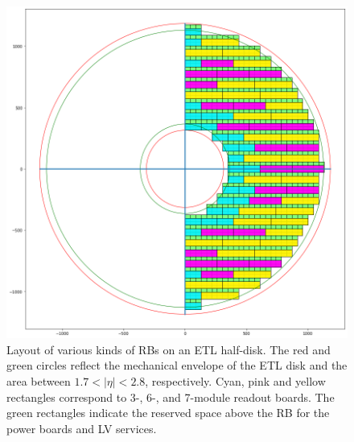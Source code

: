 \documentclass[11pt]{article}
\begin{document}
\begin{figure}[!ht]
\centering
\includegraphics[width=\linewidth]{figures/coverage.png}
\caption{
Layout of various kinds of RBs on an ETL half-disk.
The red and green circles reflect the mechanical envelope of the ETL disk and the area between $1.7<|\eta|<2.8$, respectively.
Cyan, pink and yellow rectangles correspond to 3-, 6-, and 7-module readout boards.
The green rectangles indicate the reserved space above the RB for the power boards and LV services.
}
\label{fig:coverage}
\end{figure}
\end{document}
